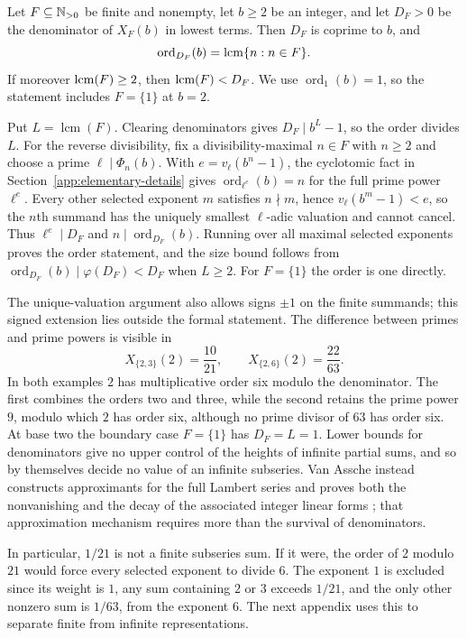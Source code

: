 \documentclass[11pt]{article}
\begin{document}
\begin{theorem}\label{res:period}
Let $F\subseteq\mathbb{N}_{>0}$ be finite and nonempty, let $b\ge2$ be an integer, and
let $D_F>0$ be the denominator of $X_F(b)$ in lowest terms.  Then $D_F$ is
coprime to $b$, and
\[
  \operatorname{ord}_{D_F}(b)=\operatorname{lcm}\{n:n\in F\}.
\]
If moreover $\operatorname{lcm}(F)\ge2$, then $\operatorname{lcm}(F)<D_F$.  We use
$\operatorname{ord}_1(b)=1$, so the statement includes $F=\{1\}$
at $b=2$.
\end{theorem}

Put $L=\operatorname{lcm}(F)$. Clearing denominators gives
$D_F\mid b^L-1$, so the order divides $L$. For the reverse divisibility,
fix a divisibility-maximal $n\in F$ with $n\ge2$ and choose a prime
$\ell\mid\Phi_n(b)$. With $e=v_\ell(b^n-1)$, the cyclotomic fact in
Section~\ref{app:elementary-details} gives
$\operatorname{ord}_{\ell^e}(b)=n$ for the full prime power $\ell^e$.
Every other selected exponent $m$ satisfies $n\nmid m$, hence
$v_\ell(b^m-1)<e$, so the $n$th summand has the uniquely smallest
$\ell$-adic valuation and cannot cancel. Thus $\ell^e\mid D_F$ and
$n\mid\operatorname{ord}_{D_F}(b)$. Running over all maximal selected
exponents proves the order statement, and the size bound follows from
$\operatorname{ord}_{D_F}(b)\mid\varphi(D_F)<D_F$ when $L\ge2$. For
$F=\{1\}$ the order is one directly.

The unique-valuation argument also allows signs $\pm1$ on the finite
summands; this signed extension lies outside the formal statement. The
difference between primes and prime powers is visible in
\[
 X_{\{2,3\}}(2)=\frac{10}{21},\qquad
 X_{\{2,6\}}(2)=\frac{22}{63}.
\]
In both examples $2$ has multiplicative order six modulo the
denominator. The first combines the orders two and three, while the
second retains the prime power $9$, modulo which $2$ has order six,
although no prime divisor of $63$ has order six. At base two the
boundary case $F=\{1\}$ has $D_F=L=1$. Lower bounds for denominators
give no upper control of the heights of infinite partial sums, and so
by themselves decide no value of an infinite subseries. Van Assche
instead constructs approximants for the full Lambert series and proves
both the nonvanishing and the decay of the associated integer linear
forms \cite[Lemma~1 and (34)--(35)]{vanassche2001}; that approximation
mechanism requires more than the survival of denominators.


In particular, $1/21$ is not a finite subseries sum. If it were, the
order of $2$ modulo $21$ would force every selected exponent to divide
$6$. The exponent $1$ is excluded since its weight is $1$, any sum
containing $2$ or $3$ exceeds $1/21$, and the only other nonzero sum is
$1/63$, from the exponent $6$. The next appendix uses this to separate
finite from infinite representations.
\end{document}

